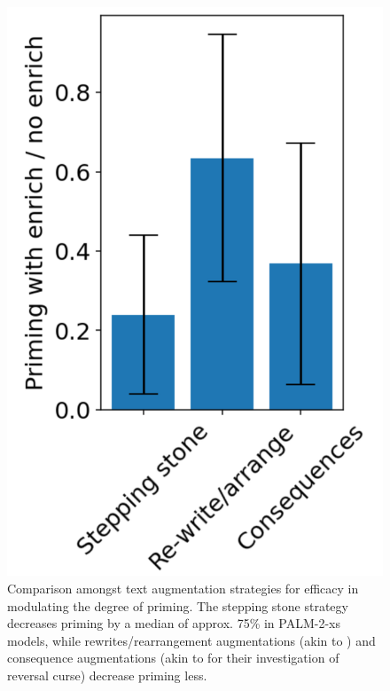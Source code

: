 \documentclass[11pt, a4paper, logo, copyright]{googledeepmind}
\theoremstyle{plain}
\theoremstyle{definition}
\theoremstyle{remark}
\begin{document}
\begin{figure}[h]
\vspace{0mm}
    \centering \includegraphics[scale=.2,clip]{figures/Stepping_stone_comparison.png}
    \vspace{-1mm}
    \caption{Comparison amongst text augmentation strategies for efficacy in modulating the degree of priming. The stepping stone strategy decreases priming by a median of approx. 75\% in PALM-2-xs models, while rewrites/rearrangement augmentations (akin to \citep{physics_LLMs}) and consequence augmentations (akin to \citep{reversal} for their investigation of reversal curse) decrease priming less. } \label{fig:Stepping_stone_comparison}
  \vspace{-0mm}
\end{figure}
\end{document}
